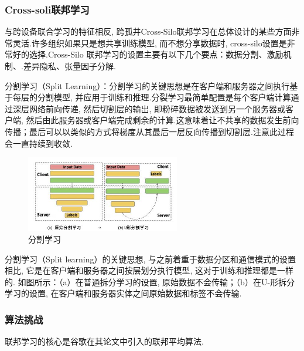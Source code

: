 \documentclass[a4paper]{article}
\theoremstyle{definition}
\numberwithin{equation}{section}
\begin{document}
\subsubsection{Cross-soli联邦学习} 
与跨设备联合学习的特征相反,  跨孤井Cross-Silo联邦学习在总体设计的某些方面非常灵活.许多组织如果只是想共享训练模型, 而不想分享数据时, cross-silo设置是非常好的选择.Cross-Silo 联邦学习的设置主要有以下几个要点：数据分割、激励机制、.差异隐私、张量因子分解.


分割学习（Split Learning）：分割学习的关键思想是在客户端和服务器之间执行基于每层的分割模型, 并应用于训练和推理.分裂学习最简单配置是每个客户端计算通过深层网络前向传递, 然后切割层的输出, 即粉碎数据被发送到另一个服务器或客户端, 然后由此服务器或客户端完成剩余的计算.这意味着让不共享的数据发生前向传播；最后可以以类似的方式将梯度从其最后一层反向传播到切割层.注意此过程会一直持续到收敛.
\begin{figure}[ht]
    \centering    
    \includegraphics[width=0.6\textwidth]{split_learning.jpg}
    \caption{分割学习}
\end{figure}


分割学习（Split learning）的关键思想, 与之前着重于数据分区和通信模式的设置相比, 它是在客户端和服务器之间按层划分执行模型, 这对于训练和推理都是一样的.
如图所示：（a）在普通拆分学习的设置, 原始数据不会传输；（b）在U-形拆分学习的设置, 在客户端和服务器实体之间原始数据和标签不会传输.



\subsubsection{算法挑战}



联邦学习的核心是谷歌在其论文\cite{mcmahan2016communication}中引入的联邦平均算法\cite{alg:fedavg}. 
 
\end{document}
